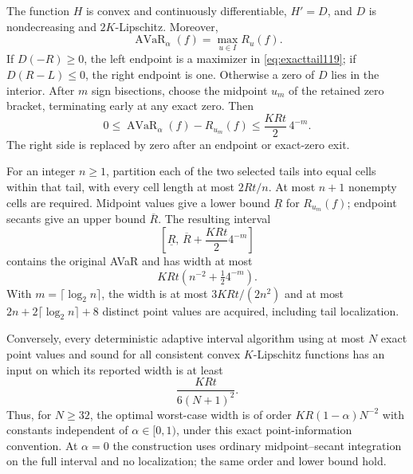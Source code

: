 \begin{theorem}
\label{thm:tailinformation119}
The function $H$ is convex and continuously differentiable, $H'=D$, and
$D$ is nondecreasing and $2K$-Lipschitz.  Moreover,
\begin{equation}\label{eq:exacttail119}
 \operatorname{AVaR}_{\alpha}(f)=\max_{u\in I} R_u(f).
\end{equation}
If $D(-R)\ge0$, the left endpoint is a maximizer in
\eqref{eq:exacttail119}; if $D(R-L)\le0$, the right endpoint is one.
Otherwise a zero of $D$ lies in the interior.  After $m$ sign bisections,
choose the midpoint $u_m$ of the retained zero bracket, terminating early
at any exact zero.  Then
\begin{equation}\label{eq:taillocalization119}
 0\le\operatorname{AVaR}_{\alpha}(f)-R_{u_m}(f)
       \le\frac{KRt}{2}\,4^{-m}.
\end{equation}
The right side is replaced by zero after an endpoint or exact-zero exit.

For an integer $n\ge1$, partition each of the two selected tails into
equal cells within that tail, with every cell length at most $2Rt/n$.
At most $n+1$ nonempty cells are required.  Midpoint values give a lower
bound $\underline R$ for $R_{u_m}(f)$; endpoint secants give an upper
bound $\overline R$.  The resulting interval
\begin{equation}\label{eq:tailinterval119}
 \left[\underline R,\,
       \overline R+\frac{KRt}{2}4^{-m}\right]
\end{equation}
contains the original AVaR and has width at most
\begin{equation}\label{eq:tailwidth119}
 KRt\left(n^{-2}+\tfrac12 4^{-m}\right).
\end{equation}
With $m=\lceil\log_2 n\rceil$, the width is at most
$3KRt/(2n^2)$ and at most $2n+2\lceil\log_2 n\rceil+8$ distinct
point values are acquired, including tail localization.

Conversely, every deterministic adaptive interval algorithm using at
most $N$ exact point values and sound for all consistent convex
$K$-Lipschitz functions has an input on which its reported width is at
least
\begin{equation}\label{eq:tailinformationlower119}
 \frac{KRt}{6(N+1)^2}.
\end{equation}
Thus, for $N\ge32$, the optimal worst-case width is of order
$KR(1-\alpha)N^{-2}$ with constants independent of $\alpha\in[0,1)$,
under this exact point-information convention.  At $\alpha=0$ the
construction uses ordinary midpoint--secant integration on the full
interval and no localization; the same order and lower bound hold.
\end{theorem}

